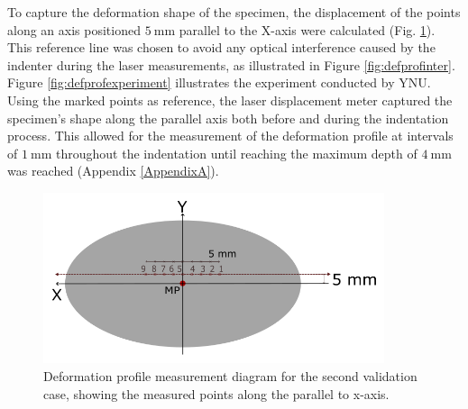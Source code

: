 To capture the deformation shape of the specimen, the displacement of the points along an axis positioned 
$\SI{5}{\milli \meter}$ parallel to the X-axis were calculated (Fig. \ref{fig:defprofdiagram}). %
This reference line was chosen to avoid any optical interference caused by the indenter during the 
laser measurements, as illustrated in Figure \ref{fig:defprofinter}.
Figure \ref{fig:defprofexperiment} illustrates the experiment conducted by YNU.
Using the marked points as reference, the laser displacement meter captured the specimen's 
shape along the parallel axis both before and during the indentation process.
This allowed for the measurement of the deformation profile at intervals of $\SI{1}{\milli \meter}$
throughout the indentation until reaching the maximum depth of $\SI{4}{\milli \meter}$ was reached (Appendix \ref{AppendixA}).\\

\begin{figure}%
	\centering
   \quad
   \includegraphics[width=10cm]{Images/validationcase/defprof/defprofdiag.png}%
   \caption[Deformation profile - Diagram]{Deformation profile measurement diagram for the second validation case, showing the measured points along the parallel to x-axis.}%
   \label{fig:defprofdiagram}%
\end{figure}

